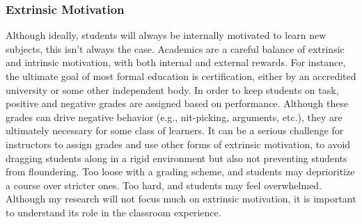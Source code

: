 \subsubsection{Extrinsic Motivation}

Although ideally, students will always be internally motivated to learn new subjects, this isn't always the case.
Academics are a careful balance of extrinsic and intrinsic motivation, with both internal and external rewards.
For instance, the ultimate goal of most formal education is certification, either by an accredited university or some other independent body.
In order to keep students on task, positive and negative grades are assigned based on performance.
Although these grades can drive negative behavior (e.g., nit-picking, arguments, etc.), they are ultimately necessary for some class of learners.
It can be a serious challenge for instructors to assign grades and use other forms of extrinsic motivation, to avoid dragging students along in a rigid environment but also not preventing students from floundering.
Too loose with a grading scheme, and students may deprioritize a course over stricter ones.
Too hard, and students may feel overwhelmed.
Although my research will not focus much on extrinsic motivation, it is important to understand its role in the classroom experience.
